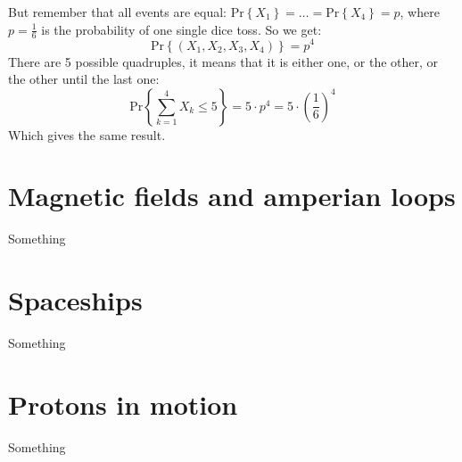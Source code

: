 But remember that all events are equal:
$\text{Pr}\left\{ X_1 \right\} = \dots = \text{Pr}\left\{ X_4 \right\} = p$,
where $p=\frac{1}{6}$ is the probability of one single dice toss.
So we get:
\begin{equation*}
    \text{Pr}\left\{ (X_1,X_2,X_3,X_4) \right\} = p^4
\end{equation*}
There are 5 possible quadruples, it means that it is either one, or the other, or the other
until the last one:
\begin{equation*}
    \text{Pr}\left\{ \sum_{k=1}^4 X_k \leq 5 \right\} = 5 \cdot p^4 = 5 \cdot \left( \frac{1}{6} \right)^4
\end{equation*}
Which gives the same result.

\section{Magnetic fields and amperian loops}
\label{sec:magnamp}
Something

\section{Spaceships}
\label{sec:spaceship}
Something

\section{Protons in motion}
\label{sec:protons}
Something
